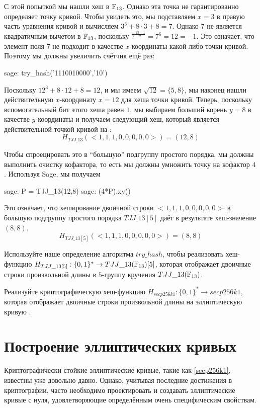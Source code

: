\begin{example}
С этой попыткой мы нашли хеш в $\mathbb{F}_{13}$. Однако эта точка не гарантированно определяет точку кривой. Чтобы увидеть это, мы подставляем $x=3$ в правую часть уравнения  кривой  и вычисляем $3^3 + 8\cdot 3 + 8 = 7$. Однако $7$ не является квадратичным вычетом в $\mathbb{F}_{13}$, поскольку $7^{\frac{13-1}{2}}=7^6=12=-1$. Это означает, что элемент поля $7$ не подходит в качестве $x$-координаты какой-либо точки кривой. Поэтому мы должны увеличить счётчик ещё раз: 
\begin{sagecommandline}
sage: try_hash('1110010000','10')
\end{sagecommandline}
Поскольку $12^3 + 8\cdot 12 + 8 = 12$, и мы имеем $\sqrt{12} = \{5, 8\}$, мы наконец нашли действительную $x$-координату $x=12$ для хеша точки кривой. Теперь, поскольку вспомогательный бит этого хеша равен $1$, мы выбираем больший корень $y=8$ в качестве $y$-координаты и получаем следующий хеш, который является действительной точкой кривой на :
$$
H_{TJJ\_13}(<1,1,1,0,0,0,0,0>) = (12,8)
$$

Чтобы спроецировать это в ``большую'' подгруппу простого порядка, мы должны выполнить очистку кофактора, то есть мы должны умножить точку на кофактор $4$. Используя Sage, мы получаем
\begin{sagecommandline}
sage: P = TJJ_13(12,8)
sage: (4*P).xy()
\end{sagecommandline}

Это означает, что хеширование двоичной строки $<1,1,1,0,0,0,0,0>$ в большую подгруппу простого порядка $TJJ\_13[5]$ даёт в результате хеш-значение $(8,8)$. 
$$
H_{TJJ\_13[5]}(<1,1,1,0,0,0,0,0>) = (8,8)
$$
\end{example}
\begin{exercise}
Используйте наше определение алгоритма $try\_hash$, чтобы реализовать хеш-функцию $H_{TJJ\_13[5]} : \{0,1\}^*\to TJJ\_13(\mathbb{F}_{13})[5]$, которая отображает двоичные строки произвольной длины в $5$-группу кручения $TJJ\_13(\mathbb{F}_{13})$.
\end{exercise}
\begin{exercise}
Реализуйте криптографическую хеш-функцию $H_{secp256k1} : \{0,1\}^*\to secp256k1$, которая отображает двоичные строки произвольной длины на эллиптическую кривую .
\end{exercise}
\section{Построение эллиптических кривых} Криптографически стойкие эллиптические кривые, такие как  \ref{secp256k1}, известны уже довольно давно. Однако, учитывая последние достижения в криптографии, часто необходимо проектировать и создавать эллиптические кривые с нуля, удовлетворяющие определённым очень специфическим свойствам. 

